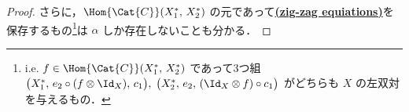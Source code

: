 \documentclass[TQFT_main]{subfiles}
\begin{document}
\begin{proof}
    さらに，$\Hom{\Cat{C}} (X_1^*,\, X_2^*)$ の元であって\hyperref[redef:dual]{\textsf{\textbf{(zig-zag equiations)}}}を保存するもの\footnote{i.e. $f \in  \Hom{\Cat{C}} (X_1^*,\, X_2^*)$ であって3つ組 $\bigl(X_1^*,\, e_2 \circ (f \otimes \Id_{X}),\, c_1\bigr),\; \bigl( X_2^*,\, e_2,\, (\Id_X \otimes f) \circ c_1 \bigr)$ がどちらも $X$ の左双対を与えるもの．}は $\alpha$ しか存在しないことも分かる．

\end{proof}
\end{document}
